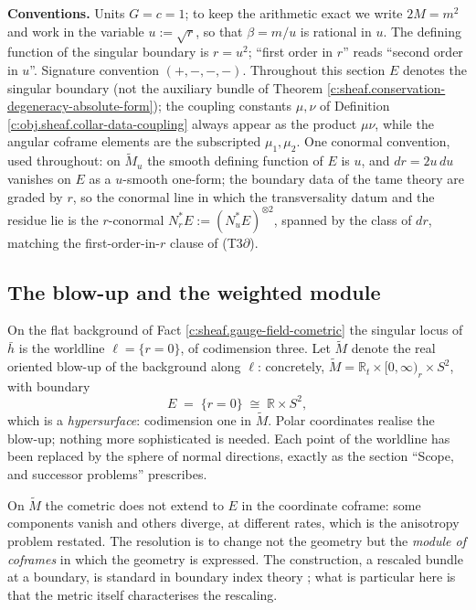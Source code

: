 \documentclass[11pt]{article}
\theoremstyle{definition}
\theoremstyle{plain}
\providecommand{\Mt}{}\renewcommand{\Mt}{\widetilde{M}}
\providecommand{\R}{}\renewcommand{\R}{\mathbb{R}}
\providecommand{\hb}{}\renewcommand{\hb}{\bar{h}}
\begin{document}
\label{c:note.sheaf.setting-schwarzschild-composite-2}
\noindent\textbf{Conventions.} Units $G = c = 1$; to keep the arithmetic exact we write $2M = m^2$ and work in the variable $u := \sqrt{r}$, so that $\beta = m/u$ is rational in $u$. The defining function of the singular boundary is $r = u^2$; ``first order in $r$'' reads ``second order in $u$''. Signature convention $({+},{-},{-},{-})$. Throughout this section $E$ denotes the singular boundary (not the auxiliary bundle of Theorem \ref{c:sheaf.conservation-degeneracy-absolute-form}); the coupling constants $\mu, \nu$ of Definition \ref{c:obj.sheaf.collar-data-coupling} always appear as the product $\mu\nu$, while the angular coframe elements are the subscripted $\mu_1, \mu_2$. One conormal convention, used throughout: on $\Mt_u$ the smooth defining function of $E$ is $u$, and $dr = 2u\,du$ vanishes on $E$ as a $u$-smooth one-form; the boundary data of the tame theory are graded by $r$, so the conormal line in which the transversality datum and the residue lie is the $r$-conormal $N^*_r E := (N^*_u E)^{\otimes 2}$, spanned by the class of $dr$, matching the first-order-in-$r$ clause of (T3$\partial$).

\subsection*{The blow-up and the weighted module}
\label{c:note.sheaf.setting-blow-up-weighted-module}
On the flat background of Fact \ref{c:sheaf.gauge-field-cometric} the singular locus of $\hb$ is the worldline $\ell = \{r = 0\}$, of codimension three. Let $\Mt$ denote the real oriented blow-up of the background along $\ell$: concretely, $\Mt = \R_t \times [0,\infty)_r \times S^2$, with boundary
\[
E \;=\; \{r = 0\} \;\cong\; \R \times S^2 ,
\]
which is a \emph{hypersurface}: codimension one in $\Mt$. Polar coordinates realise the blow-up; nothing more sophisticated is needed. Each point of the worldline has been replaced by the sphere of normal directions, exactly as the section ``Scope, and successor problems'' prescribes.

On $\Mt$ the cometric does not extend to $E$ in the coordinate coframe: some components vanish and others diverge, at different rates, which is the anisotropy problem restated. The resolution is to change not the geometry but the \emph{module of coframes} in which the geometry is expressed. The construction, a rescaled bundle at a boundary, is standard in boundary index theory \cite{Melrose1993}; what is particular here is that the metric itself characterises the rescaling.
\end{document}
